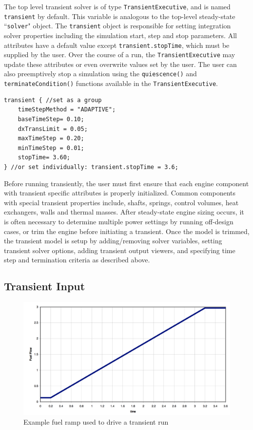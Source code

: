 \documentclass[heading.tex]{subfiles}
\begin{document}
The top level transient solver is of type \texttt{TransientExecutive}, and is named \texttt{transient} by default. This variable is analogous to the top-level steady-state ``\texttt{solver}" object. The \texttt{transient} object is responsible for setting integration solver properties including the simulation start, step and stop parameters. \cite[chap.~7.5]{NPSS} \cite[chap.~15.1.8]{NPSS}  All attributes have a default value except \texttt{transient.stopTime}, which must be supplied by the user. Over the course of a run, the \texttt{TransientExecutive} may update these attributes or even overwrite values set by the user. The user can also preemptively stop a simulation using the  \texttt{quiescence()} and  \texttt{terminateCondition()} functions available in the \texttt{TransientExecutive}.

\begin{adjustwidth}{0cm}{0cm}
 \begin{verbatim}
transient { //set as a group
	timeStepMethod = "ADAPTIVE";
	baseTimeStep= 0.10;
	dxTransLimit = 0.05;
	maxTimeStep = 0.20;
	minTimeStep = 0.01;
	stopTime= 3.60;
} //or set individually: transient.stopTime = 3.6;
 \end{verbatim}
 \end{adjustwidth} 

Before running transiently, the user must first ensure that each engine component with transient specific attributes is properly initialized. Common components with special transient properties include, shafts, springs, control volumes, heat exchangers, walls and thermal masses.
After steady-state engine sizing occurs, it is often necessary to determine multiple power settings by running off-design cases, or trim the engine before initiating a transient. Once the model is trimmed, the transient model is setup by adding/removing solver variables, setting transient solver options, adding transient output viewers, and specifying time step and termination criteria as described above.

\subsection{Transient Input}



\begin{figure}[H]
\centering
\includegraphics[width=1.0\textwidth]{images/fuelRamp}
\caption{Example fuel ramp used to drive a transient run}
\label{f:ramp}
\end{figure}
\end{document}
